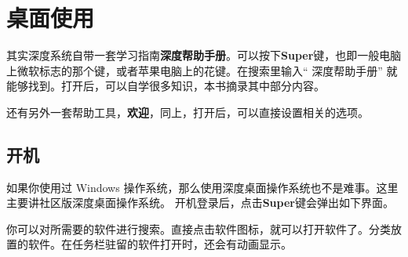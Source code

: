 \documentclass[doctor,openright,twoside]{sjtuthesis}
\theoremstyle{plain}
\theoremstyle{definition}
\theoremstyle{remark}
\theoremstyle{ocrenumbox}
\theoremstyle{plain}
\begin{document}
\hypertarget{section-20}{%
\section{桌面使用}\label{section-20}}

其实深度系统自带一套学习指南\textbf{深度帮助手册}。可以按下\textbf{Super}键，也即一般电脑上微软标志的那个键，或者苹果电脑上的花键。在搜索里输入`` 深度帮助手册'' 就能够找到。打开后，可以自学很多知识，本书摘录其中部分内容。

还有另外一套帮助工具，\textbf{欢迎}，同上，打开后，可以直接设置相关的选项。

\hypertarget{section-21}{%
\subsection{开机}\label{section-21}}

如果你使用过 Windows 操作系统，那么使用深度桌面操作系统也不是难事。这里主要讲社区版深度桌面操作系统。
开机登录后，点击\textbf{Super}键会弹出如下界面。


你可以对所需要的软件进行搜索。直接点击软件图标，就可以打开软件了。分类放置的软件。在任务栏驻留的软件打开时，还会有动画显示。
\end{document}
